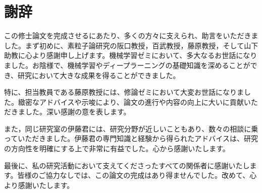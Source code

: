 \documentclass[a4paper,11pt]{jsreport}
\begin{document}
\chapter*{謝辞} %

この修士論文を完成させるにあたり、多くの方々に支えられ、助言をいただきました。まず初めに、素粒子論研究の阪口教授，百武教授，藤原教授，そして山下助教に心より感謝申し上げます。機械学習ゼミにおいて、多大なるお世話になりました。お陰様で、機械学習やディープラーニングの基礎知識を深めることができ、研究において大きな成果を得ることができました。\par
特に、担当教員である藤原教授には、修論ゼミにおいて大変お世話になりました。緻密なアドバイスや示唆により、論文の進行や内容の向上に大いに貢献いただきました。深い感謝の意を表します。\par
また，同じ研究室の伊藤君には、研究分野が近しいこともあり、数々の相談に乗っていただきました。伊藤君の専門知識と経験から得られたアドバイスは、研究の方向性を明確にする上で非常に有益でした。心から感謝いたします。\par
最後に、私の研究活動において支えてくださったすべての関係者に感謝いたします。皆様のご協力なしでは、この論文の完成はあり得ませんでした。改めて、心より感謝いたします。


\renewcommand{\bibname}{参考文献} %

\end{document}
